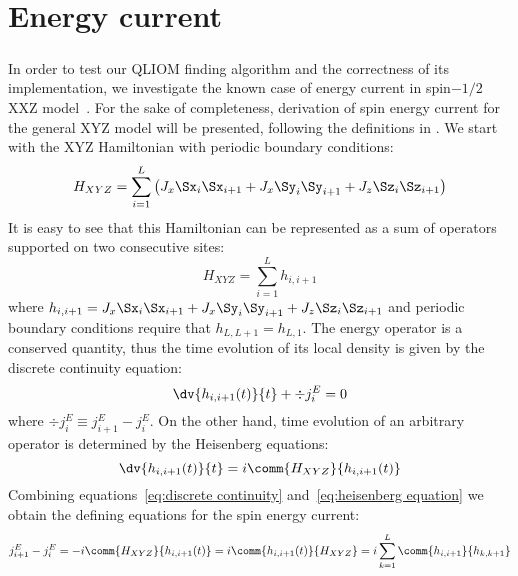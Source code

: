 \chapter{Energy current}
\thispagestyle{chapterBeginStyle}
\label{chap:energy current}

\paragraph{}In order to test our QLIOM finding algorithm and the correctness of its implementation, we investigate the known case of
energy current in spin\(-1/2\) XXZ model~\autocite*{Mierzejewski2015Approx}. For the sake of completeness, derivation of
spin energy current for the general XYZ model will be presented, following the definitions in \autocite{Zotos1997}.
We start with the XYZ Hamiltonian with periodic boundary conditions:
\begin{equation}
    H_{XYZ} = \sum_{i=1}^L  \left( J_{x} \Sx_{i}\Sx_{i+1} + J_{x} \Sy_{i}\Sy_{i+1} + J_{z} \Sz_{i}\Sz_{i+1} \right)
\end{equation}
It is easy to see that this Hamiltonian can be represented as a sum of operators supported on two consecutive sites:
\begin{equation}
    H_{XYZ} = \sum_{i=1}^L h_{i,i+1}
\end{equation}
where \(h_{i,i+1} = J_{x} \Sx_{i}\Sx_{i+1} + J_{x} \Sy_{i}\Sy_{i+1} + J_{z} \Sz_{i}\Sz_{i+1} \) and periodic boundary conditions
require that \(h_{L,L+1} = h_{L,1}\). The energy operator is a conserved quantity, thus the time evolution of its local density
is given by the discrete continuity equation:
\begin{equation}
    \dv{h_{i,i+1}(t)}{t} + \div{j_{i}^{E}} = 0 
    \label{eq:discrete continuity}
\end{equation}
where \(\div{j_{i}^E} \equiv j_{i+1}^E - j_{i}^E\). On the other hand, time evolution of an arbitrary operator is determined
by the Heisenberg equations:
\begin{equation}
    \dv{h_{i,i+1}(t)}{t} = i \comm{H_{XYZ}}{h_{i,i+1}(t)}
    \label{eq:heisenberg equation}
\end{equation}
Combining equations~\ref{eq:discrete continuity} and~\eqref{eq:heisenberg equation} we obtain the defining equations for
the spin energy current:
\begin{equation}
    j_{i+1}^E - j_{i}^E = - i \comm{H_{XYZ}}{h_{i,i+1}(t)} = i \comm{h_{i,i+1}(t)}{H_{XYZ}} = i \sum_{k=1}^L \comm{h_{i,i+1}}{h_{k,k+1}} 
    \label{eq:energy current defining equation}
\end{equation}
